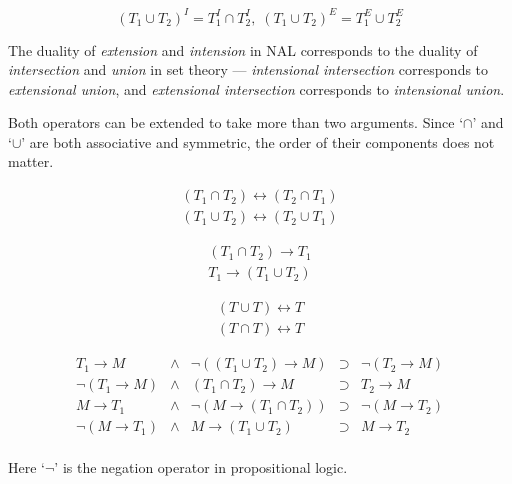 \begin{theo}
\[(T_1 \cup T_2)^I = T_1^I \cap T_2^I, \; (T_1 \cup T_2)^E = T_1^E \cup T_2^E\]
\end{theo}

The duality of \emph{extension} and \emph{intension} in NAL corresponds to the duality of \emph{intersection} and \emph{union} in set theory --- \emph{intensional intersection} corresponds to \emph{extensional union}, and \emph{extensional intersection} corresponds to \emph{intensional union}.

Both operators can be extended to take more than two arguments.  Since `$\cap$' and `$\cup$' are both associative and symmetric, the order of their components does not matter. 

\begin{theo}
\[\begin{array}{c}
(T_1 \cap T_2) \leftrightarrow (T_2 \cap T_1) \\
(T_1 \cup T_2) \leftrightarrow (T_2 \cup T_1) 
\end{array}\]
\end{theo}

\begin{theo}
\[\begin{array}{c}
(T_1 \cap T_2) \rightarrow T_1 \\
T_1 \rightarrow (T_1 \cup T_2) 
\end{array}\]
\end{theo}

\begin{theo}
\[\begin{array}{c}
(T \cup T) \leftrightarrow T \\
(T \cap T) \leftrightarrow T 
\end{array}\]
\end{theo}

\begin{theo}
\[\begin{array}{rclcr}
T_1 \rightarrow M & \wedge & \neg ((T_1 \cup T_2) \rightarrow M) & \supset & \neg (T_2 \rightarrow M) \\
\neg(T_1 \rightarrow M) & \wedge & (T_1 \cap T_2) \rightarrow M & \supset & T_2 \rightarrow M \\
M \rightarrow T_1 & \wedge & \neg (M \rightarrow (T_1 \cap T_2)) & \supset & \neg (M \rightarrow T_2) \\
\neg (M \rightarrow T_1) & \wedge & M \rightarrow (T_1 \cup T_2) & \supset & M \rightarrow T_2 \\
\end{array}\]
\end{theo}
Here `$\neg$' is the negation operator in propositional logic.


